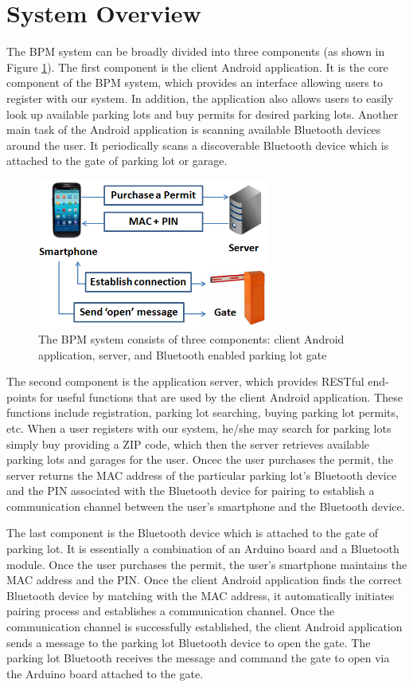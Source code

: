 \section{System Overview}
\label{system overview}

The BPM system can be broadly divided into three components (as shown in Figure \ref{fig:sys_overview}). The first component is the client Android application. It is the core component of the BPM system, which provides an interface allowing users to register with our system. In addition, the application also allows users to easily look up available parking lots and buy permits for desired parking lots. Another main task of the Android application is scanning available Bluetooth devices around the user. It periodically scans a discoverable Bluetooth device which is attached to the gate of parking lot or garage. 

\begin{figure}[ht]
	\centering
		\includegraphics[width=3in]{figure/sys_overview.png}
		\caption{The BPM system consists of three components: client Android application, server, and Bluetooth enabled parking lot gate}
	\label{fig:sys_overview}
\end{figure}

The second component is the application server, which provides RESTful end-points for useful functions that are used by the client Android application. These functions include registration, parking lot searching, buying parking lot permits, etc. When a user registers with our system, he/she may search for parking lots simply buy providing a ZIP code, which then the server retrieves available parking lots and garages for the user. Oncec the user purchases the permit, the server returns the MAC address of the particular parking lot's Bluetooth device and the PIN associated with the Bluetooth device for pairing to establish a communication channel between the user's smartphone and the Bluetooth device.

The last component is the Bluetooth device which is attached to the gate of parking lot. It is essentially a combination of an Arduino board and a Bluetooth module. Once the user purchases the permit, the user's smartphone maintains the MAC address and the PIN. Once the client Android application finds the correct Bluetooth device by matching with the MAC address, it automatically initiates pairing process and establishes a communication channel. Once the communication channel is successfully established, the client Android application sends a message to the parking lot Bluetooth device to open the gate. The parking lot Bluetooth receives the message and command the gate to open via the Arduino board attached to the gate.